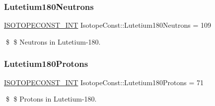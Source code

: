 \subsubsection{\texorpdfstring{Lutetium180\+Neutrons}{Lutetium180Neutrons}}
{\footnotesize\ttfamily \mbox{\hyperlink{group___isotope_const-_macros_ga5f18360b3e99483a35c32d789e62621c}{I\+S\+O\+T\+O\+P\+E\+C\+O\+N\+S\+T\+\_\+\+I\+NT}} Isotope\+Const\+::\+Lutetium180\+Neutrons = 109}

\$ \$ Neutrons in Lutetium-\/180. \mbox{\label{group___isotope_const-_lutetium-_lu180_gaa45a55092e7f0048997f917d236e0cc3}} 
\subsubsection{\texorpdfstring{Lutetium180\+Protons}{Lutetium180Protons}}
{\footnotesize\ttfamily \mbox{\hyperlink{group___isotope_const-_macros_ga5f18360b3e99483a35c32d789e62621c}{I\+S\+O\+T\+O\+P\+E\+C\+O\+N\+S\+T\+\_\+\+I\+NT}} Isotope\+Const\+::\+Lutetium180\+Protons = 71}

\$ \$ Protons in Lutetium-\/180. 